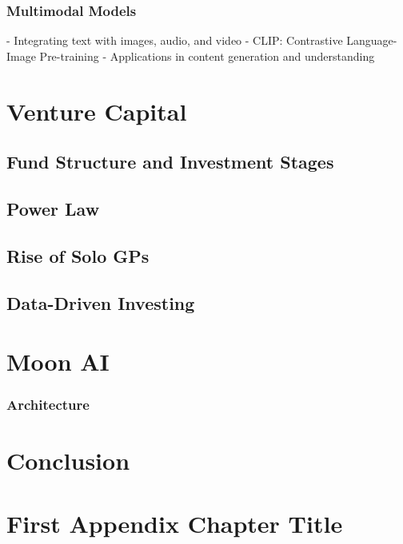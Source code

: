 \documentclass[a4paper, oneside]{discothesis}
\begin{document}
\subsection{Multimodal Models}
- Integrating text with images, audio, and video
- CLIP: Contrastive Language-Image Pre-training
- Applications in content generation and understanding

\chapter{Venture Capital}
\section{Fund Structure and Investment Stages}
\section{Power Law}
\section{Rise of Solo GPs}
\section{Data-Driven Investing}

\chapter{Moon AI}
\subsection{Architecture}

\chapter{Conclusion}





\appendix
\chapter{First Appendix Chapter Title}
\end{document}
